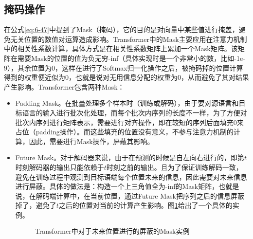 
\subsection{掩码操作}

\parinterval 在公式\ref{eq:6-47}中提到了Mask（掩码），它的目的是对向量中某些值进行掩盖，避免无关位置的数值对运算造成影响。Transformer中的Mask主要应用在注意力机制中的相关性系数计算，具体方式是在相关性系数矩阵上累加一个Mask矩阵。该矩阵在需要Mask的位置的值为负无穷-inf（具体实现时是一个非常小的数，比如-1e-9），其余位置为0，这样在进行了Softmax归一化操作之后，被掩码掉的位置计算得到的权重便近似为0，也就是说对无用信息分配的权重为0，从而避免了其对结果产生影响。Transformer包含两种Mask：

\begin{itemize}
\vspace{0.5em}
\item Padding Mask。在批量处理多个样本时（训练或解码），由于要对源语言和目标语言的输入进行批次化处理，而每个批次内序列的长度不一样，为了方便对批次内序列进行矩阵表示，需要进行对齐操作，即在较短的序列后面填充0来占位（padding操作）。而这些填充的位置没有意义，不参与注意力机制的计算，因此，需要进行Mask操作，屏蔽其影响。
\vspace{0.5em}
\item Future Mask。对于解码器来说，由于在预测的时候是自左向右进行的，即第$t$时刻解码器的输出只能依赖于$t$时刻之前的输出。且为了保证训练解码一致，避免在训练过程中观测到目标语端每个位置未来的信息，因此需要对未来信息进行屏蔽。具体的做法是：构造一个上三角值全为-inf的Mask矩阵，也就是说，在解码端计算中，在当前位置，通过Future Mask把序列之后的信息屏蔽掉了，避免了$t$之后的位置对当前的计算产生影响。图\ref{fig:6-47}给出了一个具体的实例。

\begin{figure}[htp]
\centering

\caption{Transformer中对于未来位置进行的屏蔽的Mask实例}
\label{fig:6-47}
\end{figure}

\vspace{0.5em}
\end{itemize}

